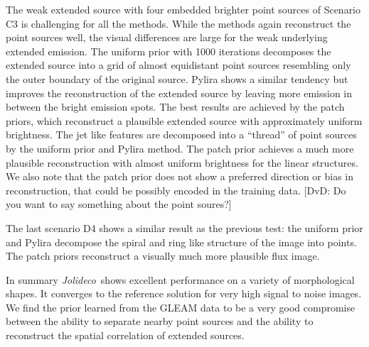 \documentclass[twocolumn]{aastex631}
\newcommand{\jolideco}{\textit{Jolideco}~}
\newcommand{\dvd}[1]{{\color{red} [DvD: #1]}}
\begin{document}
    The weak extended source with four embedded brighter point sources of Scenario C3 is challenging for all the methods. While the methods again reconstruct the point sources well, the visual differences are large for the weak underlying extended emission. The uniform prior with 1000 iterations decomposes the extended source into a grid of almost equidistant point sources resembling only the outer boundary of the original source. Pylira shows a similar tendency but improves the reconstruction of the extended source by leaving more emission in between the bright emission spots. The best results are achieved by the patch priors, which reconstruct a plausible extended source with approximately uniform brightness. The jet like features %
    are decomposed into a \enquote{thread} of point sources by the uniform prior and Pylira method. The patch prior achieves a much more plausible reconstruction with almost uniform brightness for the linear structures. We also note that the patch prior does not show a preferred direction or bias in reconstruction, that could be possibly encoded in the training data. \dvd{Do you want to say something about the point soures?}

    The last scenario D4 shows a similar result as the previous test: the uniform prior and Pylira decompose the spiral and ring like structure of the image into points. The patch priors reconstruct a visually much more plausible flux image.

    In summary \jolideco shows excellent performance on a variety of morphological shapes. It converges to the reference solution for very high signal to noise images. We find the prior learned from the GLEAM data to be a very good compromise between the ability to separate nearby point sources and the ability to reconstruct the spatial correlation of extended sources.
    
\end{document}
